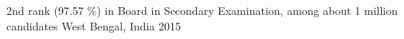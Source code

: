 \begin{cvhonors}

  \cvhonor
    {2nd rank (97.57 \%) in Board} %
    {in Secondary Examination, among about 1 million candidates} %
    {West Bengal, India} %
    {2015} %

\end{cvhonors}

